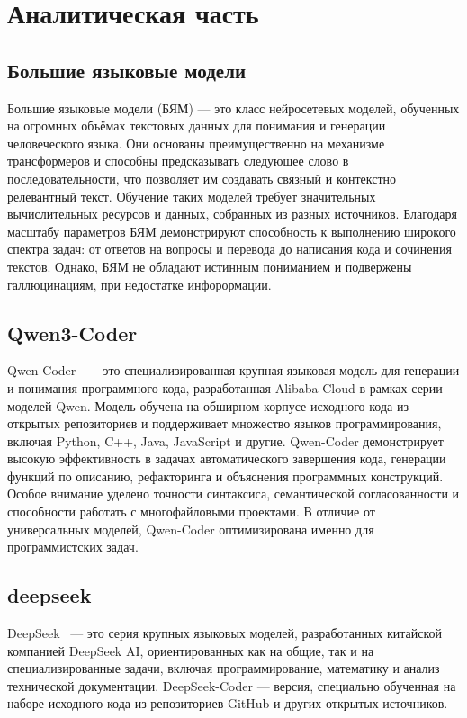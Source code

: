 \chapter{Аналитическая часть}

\section{Большие языковые модели}

Большие языковые модели (БЯМ) --- это класс нейросетевых моделей,
обученных на огромных объёмах текстовых данных для понимания и генерации человеческого языка.
Они основаны преимущественно на механизме трансформеров и способны предсказывать следующее слово в последовательности,
что позволяет им создавать связный и контекстно релевантный текст.
Обучение таких моделей требует значительных вычислительных ресурсов и данных, собранных из разных источников.
Благодаря масштабу параметров БЯМ демонстрируют способность к выполнению широкого спектра задач: от ответов на вопросы и
перевода до написания кода и сочинения текстов.
Однако, БЯМ не обладают истинным пониманием и подвержены галлюцинациям, при недостатке инфорормации.


\section{Qwen3-Coder}

Qwen-Coder~\cite{qwen} --- это специализированная крупная языковая модель для генерации и понимания программного кода, разработанная Alibaba Cloud в рамках серии моделей Qwen. Модель обучена на обширном корпусе исходного кода из открытых репозиториев и поддерживает множество языков программирования, включая Python, C++, Java, JavaScript и другие. Qwen-Coder демонстрирует высокую эффективность в задачах автоматического завершения кода, генерации функций по описанию, рефакторинга и объяснения программных конструкций. Особое внимание уделено точности синтаксиса, семантической согласованности и способности работать с многофайловыми проектами. В отличие от универсальных моделей, Qwen-Coder оптимизирована именно для программистских задач.

\section{deepseek}

DeepSeek~\cite{deepseek} --- это серия крупных языковых моделей, разработанных китайской компанией DeepSeek AI,
ориентированных как на общие, так и на специализированные задачи, включая программирование,
математику и анализ технической документации. DeepSeek-Coder — версия, специально обученная на наборе исходного кода из репозиториев GitHub
и других открытых источников.

